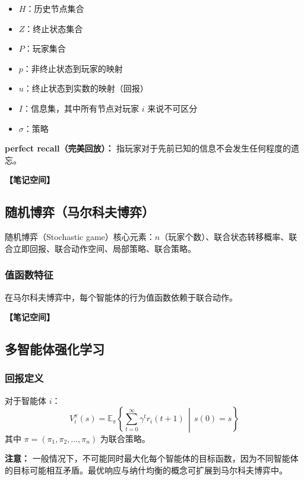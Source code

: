 \documentclass[12pt,a4paper]{article}
\newcommand{\notespace}[1][3cm]{%
  \vspace{#1}%
  \noindent\textbf{【笔记空间】}%
  \vspace{#1}%
}
\newcommand{\E}{\mathbb{E}}
\newcommand{\1}{\mathbf{1}}
\begin{document}
\begin{itemize}[leftmargin=2em]
  \item $H$：历史节点集合
  \item $Z$：终止状态集合
  \item $P$：玩家集合
  \item $p$：非终止状态到玩家的映射
  \item $u$：终止状态到实数的映射（回报）
  \item $I$：信息集，其中所有节点对玩家 $i$ 来说不可区分
  \item $\sigma$：策略
\end{itemize}

\begin{notebox}
\textbf{perfect recall（完美回放）：} 指玩家对于先前已知的信息不会发生任何程度的遗忘。
\end{notebox}

\notespace[2cm]

\subsection{随机博弈（马尔科夫博弈）}

随机博弈（Stochastic game）核心元素：$n$（玩家个数）、联合状态转移概率、联合立即回报、联合动作空间、局部策略、联合策略。

\subsubsection*{值函数特征}

在马尔科夫博弈中，每个智能体的行为值函数依赖于联合动作。

\notespace[2cm]

\subsection{多智能体强化学习}

\subsubsection*{回报定义}

对于智能体 $i$：
\begin{equation}
V_i^\pi(s)=\E_\pi\left\{\sum_{t=0}^{\infty}\gamma^t r_i(t+1)\,\middle|\, s(0)=s\right\}
\end{equation}
其中 $\pi=(\pi_1,\pi_2,\dots,\pi_n)$ 为联合策略。

\begin{keybox}
\textbf{注意：} 一般情况下，不可能同时最大化每个智能体的目标函数，因为不同智能体的目标可能相互矛盾。最优响应与纳什均衡的概念可扩展到马尔科夫博弈中。
\end{keybox}
\end{document}
